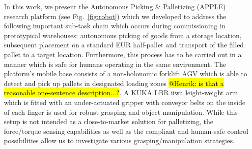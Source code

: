 In this work, we present the Autonomous Picking \& Palletizing (APPLE) research platform (see
Fig.~\ref{fig:robot}) which we developed to address the following important sub-task chain which
occurs during commissioning in prototypical warehouses: autonomous picking of goods from a storage
location, subsequent placement on a standard EUR half-pallet and transport of the filled pallet to a
target location. Furthermore, this process has to be carried out in a manner which is safe for
humans operating in the same environment. The platform's mobile base consists of a non-holonomic
forklift AGV which is able to detect and pick up pallets in designated loading zones \hl{@Henrik: is
  that a reasonable one-sentence description...?}. A KUKA LBR iiwa leight-weight arm which is fitted
with an under-actuated gripper with conveyor belts on the inside of each finger is used for robust
grasping and object manipulation. While this setup is not intended as a close-to-market solution for
palletizing, the force/torque sensing capabilities as well as the compliant and human-safe control
possibilities allow us to investigate various grasping/manipulation strategies.
%
